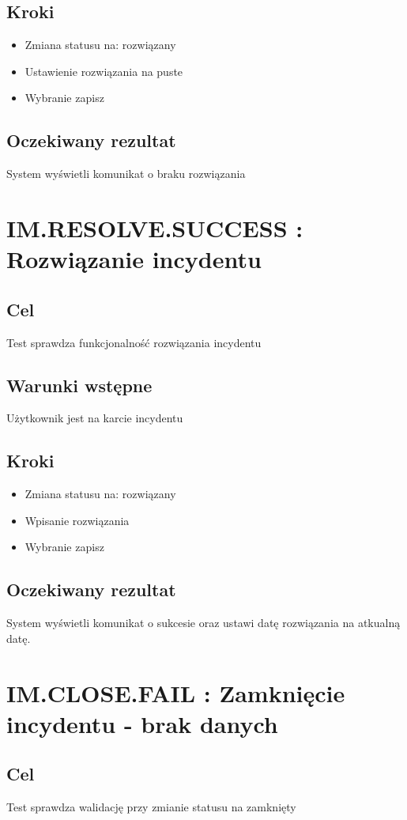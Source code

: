 \documentclass[a4paper, oneside, 11pt]{report}
\begin{document}
\subsection*{Kroki}
\begin{itemize}
	\item Zmiana statusu na: rozwiązany
	\item Ustawienie rozwiązania na puste
	\item Wybranie zapisz
\end{itemize}
\subsection*{Oczekiwany rezultat}
System wyświetli komunikat o braku rozwiązania

\section{IM.RESOLVE.SUCCESS : Rozwiązanie incydentu}
\subsection*{Cel}
Test sprawdza funkcjonalność rozwiązania incydentu
\subsection*{Warunki wstępne}
Użytkownik jest na karcie incydentu
\subsection*{Kroki}
\begin{itemize}
	\item Zmiana statusu na: rozwiązany
	\item Wpisanie rozwiązania
	\item Wybranie zapisz
\end{itemize}
\subsection*{Oczekiwany rezultat}
System wyświetli komunikat o sukcesie oraz ustawi datę rozwiązania na atkualną datę.

\section{IM.CLOSE.FAIL : Zamknięcie incydentu - brak danych}
\subsection*{Cel}
Test sprawdza walidację przy zmianie statusu na zamknięty
\end{document}

